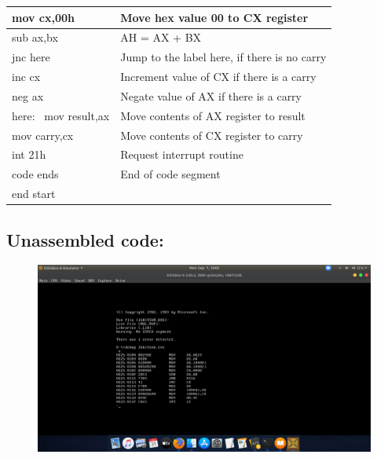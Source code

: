 \documentclass[12pt,a4paper]{article}
\begin{document}
\begin{flushleft}
\begin{table}[htb]
{\begin{tabular}{|l|l|}
\hline
mov cx,00h                                                       & Move hex value 00 to CX register              \\ 
\hline
sub ax,bx                                                        & AH = AX + BX                                  \\ 
\hline
jnc here                                                         & Jump to the label here, if there is no carry  \\ 
\hline
inc cx                                                           & Increment value of CX if there is a carry     \\ 
\hline
neg ax                                                           & Negate value of AX if there is a carry        \\
\hline
here:~ mov result,ax                                             & Move contents of AX register to result        \\ 
\hline
mov carry,cx                                                     & Move contents of CX register to carry         \\ 
\hline
int 21h                                                          & Request interrupt routine                     \\ 
\hline
code ends                                                        & End of code segment                           \\
\hline
end start                                                        &                                               \\
\hline
\end{tabular}
}
\end{table}

\newpage
\subsection*{\textbf{Unassembled code:}}
\begin{figure}[h]
    \centering
    \includegraphics[trim = 100mm 60mm 150mm 127mm, clip, width = \textwidth]{Pics/SubtractionUS.png}
\end{figure}

\end{flushleft}
\end{document}
